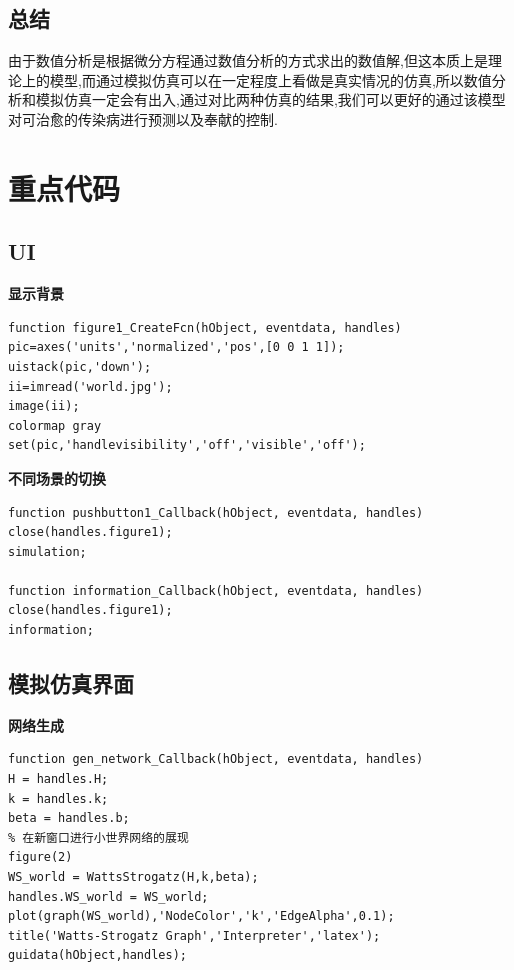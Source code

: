 \documentclass[supercite]{HustGraduPaper}
\begin{document}
	\subsection{总结}
	由于数值分析是根据微分方程通过数值分析的方式求出的数值解,但这本质上是理论上的模型,而通过模拟仿真可以在一定程度上看做是真实情况的仿真,所以数值分析和模拟仿真一定会有出入,通过对比两种仿真的结果,我们可以更好的通过该模型对可治愈的传染病进行预测以及奉献的控制.

	\section{重点代码}
	\subsection{UI}
	\textbf{显示背景} \par
	\begin{lstlisting}
function figure1_CreateFcn(hObject, eventdata, handles)
pic=axes('units','normalized','pos',[0 0 1 1]);
uistack(pic,'down');
ii=imread('world.jpg');
image(ii);
colormap gray
set(pic,'handlevisibility','off','visible','off');
	\end{lstlisting}
	\textbf{不同场景的切换}\par
	\begin{lstlisting}
function pushbutton1_Callback(hObject, eventdata, handles)
close(handles.figure1);
simulation;

function information_Callback(hObject, eventdata, handles)
close(handles.figure1);
information;
	\end{lstlisting}

	\subsection{模拟仿真界面}

	\textbf{网络生成} \par
	\begin{lstlisting}
function gen_network_Callback(hObject, eventdata, handles)
H = handles.H;
k = handles.k;
beta = handles.b;
% 在新窗口进行小世界网络的展现
figure(2)
WS_world = WattsStrogatz(H,k,beta);
handles.WS_world = WS_world;
plot(graph(WS_world),'NodeColor','k','EdgeAlpha',0.1);
title('Watts-Strogatz Graph','Interpreter','latex');
guidata(hObject,handles);
	\end{lstlisting}
\end{document}

